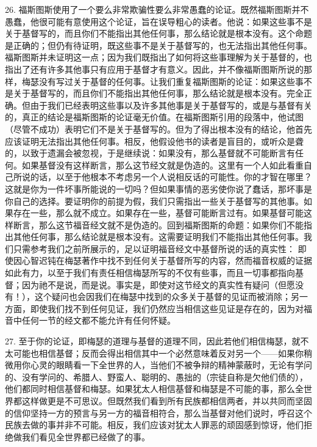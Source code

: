 26. 福斯图斯使用了一个要么非常欺骗性要么非常愚蠢的论证。既然福斯图斯并不愚蠢，他很可能有意使用这个论证，旨在误导粗心的读者。他说：如果这些事不是关于基督写的，而且你们不能指出其他任何事，那么结论就是根本没有。这个命题是正确的；但仍有待证明，既这些事不是关于基督写的，也无法指出其他任何事。福斯图斯并未证明这一点；因为我们既指出了如何将这些事理解为关于基督的，也指出了还有许多其他事只有应用于基督才有意义。因此，并不像福斯图斯所说的那样，梅瑟没有写过关于基督的任何事。让我们重复福斯图斯的论证：如果这些事不是关于基督写的，而且你们不能指出其他任何事，那么结论就是根本没有。完全正确。但由于我们已经表明这些事以及许多其他事是关于基督写的，或是与基督有关的，真正的结论是福斯图斯的论证毫无价值。在福斯图斯引用的段落中，他试图（尽管不成功）表明它们不是关于基督写的。但为了得出根本没有的结论，他首先应该证明无法指出其他任何事。相反，他假设他书的读者是盲目的，或听众是聋的，以致于遗漏会被忽视，于是继续说：如果没有，那么基督就不可能断言有任何。如果基督没有这样断言，那么这节经文就是伪造的。这里有一个人如此看重自己所说的话，以至于他根本不考虑另一个人说相反话的可能性。你的才智在哪里？这就是你为一件坏事所能说的一切吗？但如果事情的恶劣使你说了蠢话，那坏事是你自己的选择。要证明你的前提为假，我们只需指出一些关于基督写的其他事。如果存在一些，那么就不成立。如果存在一些，基督可能断言过有。如果基督可能这样断言，那么这节福音经文就不是伪造的。回到福斯图斯的命题：如果你们不能指出其他任何事，那么结论就是根本没有。这需要证明我们不能指出其他任何事。我们只需参考我们之前所展示的，足以证明福音经文中基督所说的话的真实性： 即使因心智迟钝在梅瑟著作中找不到任何关于基督所写的内容，然而福音权威的证据如此有力，以至于我们有责任相信梅瑟所写的不仅有些事，而且一切事都指向基督；因为祂不是说，而是说。事实是，即使对这节经文的真实性有疑问（但愿没有！），这个疑问也会因我们在梅瑟中找到的众多关于基督的见证而被消除；另一方面，即使我们找不到任何见证，我们仍然应当相信这些见证是存在的，因为对福音中任何一节的经文都不能允许有任何怀疑。\par

27. 至于你的论证，即梅瑟的道理与基督的道理不同，因此若他们相信梅瑟，就不太可能也相信基督；反而会得出相信其中一个必然意味着反对另一个——如果你稍微用你心灵的眼睛看一下全世界的人，当他们不被争辩的精神蒙蔽时，无论有学问的、没有学问的、希腊人、野蛮人、聪明的、愚拙的（宗徒自称是欠他们债的），他们都同时相信基督和梅瑟。如果犹太人相信基督和梅瑟是不可能的事，那么全世界都这样做更是不可思议。但既然我们看到所有民族都相信两者，并以共同而坚固的信仰坚持一方的预言与另一方的福音相符合，那么当基督对他们说时，呼召这个民族去做的事并非不可能。相反，我们应该对犹太人罪恶的顽固感到惊讶，他们拒绝做我们看见全世界都已经做了的事。\par

